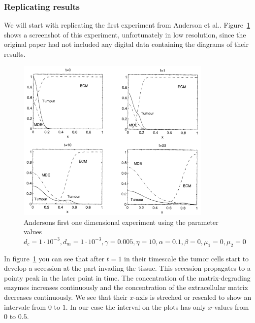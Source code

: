 \subsubsection{Replicating results}
We will start with replicating the first experiment from  Anderson et al.\cite{anderson_mathematical_2000}.  Figure~\ref{fig:anderson_experiment} shows a screenshot of this experiment, unfortunately in low resolution, since the original paper had not included any digital data containing the diagrams of their results.
\begin{figure}[h!]
    \centering
    \includegraphics[width=0.85\textwidth]{resources/images/anderson_experiment.png}
    \caption{Andersons first one dimensional experiment using the parameter values $d_c = 1\cdot 10^{-3}, d_m = 1\cdot 10^{-3}, \gamma = 0.005, \eta = 10, \alpha = 0.1, \beta = 0, \mu_1 = 0, \mu_2 = 0$}
    \label{fig:anderson_experiment}
\end{figure}
In figure~\ref{fig:anderson_experiment} you can see that after $t=1$ in their timescale the tumor cells start to develop a secession at the part invading the tissue. This secession propagates to a pointy peak in the later point in time. The concentration of the matrix-degrading enzymes increases continuously and the concentration of the extracellular matrix decreases continuously. We see that their $x$-axis is streched or rescaled to show an intervale from $0$ to $1$. In our case the interval on the plots has only $x$-values from $0$ to $0.5$.
